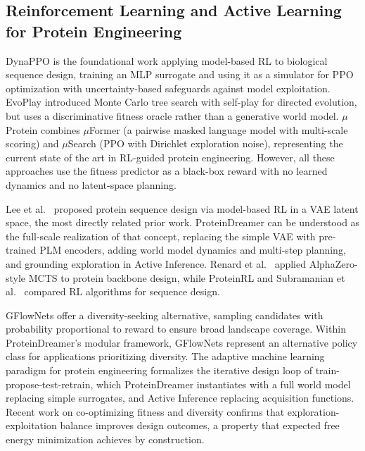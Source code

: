 \documentclass[12pt, a4paper]{article}
\begin{document}
\subsection{Reinforcement Learning and Active Learning for Protein Engineering}

DynaPPO \citep{angermueller2020dynappo} is the foundational work applying model-based RL to biological sequence design, training an MLP surrogate and using it as a simulator for PPO optimization with uncertainty-based safeguards against model exploitation. EvoPlay \citep{wang2023evoplay} introduced Monte Carlo tree search with self-play for directed evolution, but uses a discriminative fitness oracle rather than a generative world model. $\mu$Protein \citep{sun2025muprotein} combines $\mu$Former (a pairwise masked language model with multi-scale scoring) and $\mu$Search (PPO with Dirichlet exploration noise), representing the current state of the art in RL-guided protein engineering. However, all these approaches use the fitness predictor as a black-box reward with no learned dynamics and no latent-space planning.

Lee et al.\ \citep{lee2023latentrl} proposed protein sequence design via model-based RL in a VAE latent space, the most directly related prior work. ProteinDreamer can be understood as the full-scale realization of that concept, replacing the simple VAE with pre-trained PLM encoders, adding world model dynamics and multi-step planning, and grounding exploration in Active Inference. Renard et al.\ \citep{renard2024backbone} applied AlphaZero-style MCTS to protein backbone design, while ProteinRL \citep{sternke2023proteinrl} and Subramanian et al.\ \citep{subramanian2024rl_plm} compared RL algorithms for sequence design.

GFlowNets \citep{jain2022gflownets} offer a diversity-seeking alternative, sampling candidates with probability proportional to reward to ensure broad landscape coverage. Within ProteinDreamer's modular framework, GFlowNets represent an alternative policy class for applications prioritizing diversity. The adaptive machine learning paradigm for protein engineering \citep{hie2022adaptive} formalizes the iterative design loop of train-propose-test-retrain, which ProteinDreamer instantiates with a full world model replacing simple surrogates, and Active Inference replacing acquisition functions. Recent work on co-optimizing fitness and diversity \citep{ding2024cooptimization} confirms that exploration-exploitation balance improves design outcomes, a property that expected free energy minimization achieves by construction.
\end{document}

